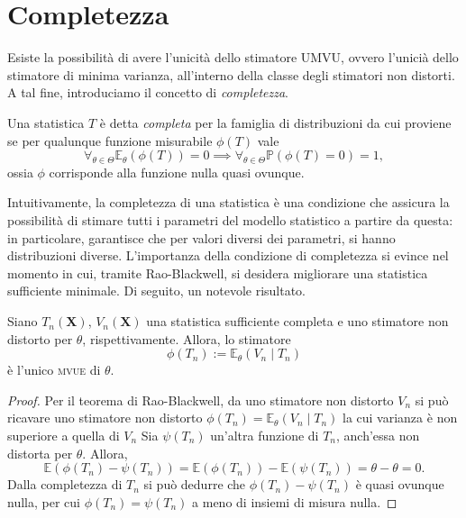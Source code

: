 \section{Completezza}

Esiste la possibilità di avere l'unicità dello stimatore {\textsc UMVU}, ovvero l'unicià dello stimatore di minima varianza, all'interno della classe degli stimatori non distorti. A tal fine, introduciamo il concetto di \emph{completezza}.

\begin{dfn}
  Una statistica \(T\) è detta \emph{completa} per la famiglia di distribuzioni da cui proviene se per qualunque funzione misurabile \(\phi(T)\) vale
  \begin{equation}
    \forall_{\theta\in\Theta}\mathbb{E}_{\theta}(\phi(T)) = 0%
    \implies%
    \forall_{\theta\in\Theta}\mathbb{P}(\phi(T)=0)=1,
  \end{equation}
  ossia \(\phi\) corrisponde alla funzione nulla quasi ovunque.
\end{dfn}

Intuitivamente, la completezza di una statistica è una condizione che assicura la possibilità di stimare tutti i parametri del modello statistico a partire da questa: in particolare, garantisce che per valori diversi dei parametri, si hanno distribuzioni diverse.
L'importanza della condizione di completezza si evince nel momento in cui,
tramite Rao-Blackwell, si desidera migliorare una statistica sufficiente
minimale. Di seguito, un notevole risultato.

\begin{thm}
  Siano \(T_n(\mathbf{X})\), \(V_n(\mathbf{X})\) una statistica sufficiente
  completa e uno stimatore non distorto per \(\theta\), rispettivamente.
  Allora, lo stimatore
  \begin{equation}
    \phi(T_n) := %
              \mathbb{E}_{\theta}(V_n \mid T_n)
  \end{equation}
  è l'unico {\textsc{mvue}} di \(\theta\).
\end{thm}
\begin{proof}
  Per il teorema di Rao-Blackwell, da uno stimatore non distorto \(V_n\) si
  può ricavare uno stimatore non distorto 
  \(\phi(T_n) = \mathbb{E}_{\theta}(V_n \mid T_n)\)
  la cui varianza è non superiore a quella di \(V_n\)
  Sia \(\psi(T_n)\) un'altra funzione di \(T_n\), anch'essa non distorta per \(\theta\). Allora,
  \begin{equation*}
    \mathbb{E}(\phi(T_n)-\psi(T_n)) = \mathbb{E}(\phi(T_n))-\mathbb{E}(\psi(T_n)) = \theta - \theta = 0.
  \end{equation*}
  Dalla completezza di \(T_n\) si può dedurre che \(\phi(T_n)-\psi(T_n)\)
  è quasi ovunque nulla, per cui \(\phi(T_n) = \psi(T_n)\) a meno di insiemi
  di misura nulla.
\end{proof}

